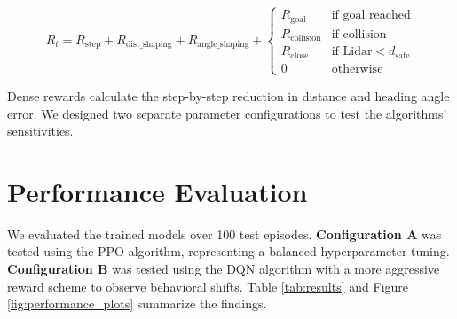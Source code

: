 \documentclass{article}
\begin{document}
\begin{equation}
    R_t = R_{\text{step}} + R_{\text{dist\_shaping}} + R_{\text{angle\_shaping}} + \begin{cases} 
      R_{\text{goal}} & \text{if goal reached} \\
      R_{\text{collision}} & \text{if collision} \\
      R_{\text{close}} & \text{if Lidar} < d_{\text{safe}} \\
      0 & \text{otherwise}
   \end{cases}
\end{equation}

Dense rewards calculate the step-by-step reduction in distance and heading angle error. We designed two separate parameter configurations to test the algorithms' sensitivities.

\section{Performance Evaluation}
We evaluated the trained models over 100 test episodes. \textbf{Configuration A} was tested using the PPO algorithm, representing a balanced hyperparameter tuning. \textbf{Configuration B} was tested using the DQN algorithm with a more aggressive reward scheme to observe behavioral shifts. Table \ref{tab:results} and Figure \ref{fig:performance_plots} summarize the findings.

\begin{table}[h]
\centering
\caption{Evaluation Results over 100 Episodes}
\label{tab:results}
\end{table}
\end{document}
